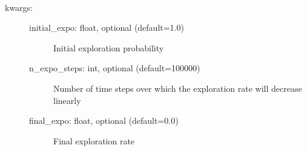 \documentclass[letterpaper,10pt,english]{sphinxmanual}
\begin{document}
\begin{fulllineitems}
\label{\detokenize{MultiAgentMarketRL:exploration_setting.LinearExplorationDecline}}~\begin{description}
\item[{kwargs:}] \leavevmode\begin{description}
\item[{initial\_expo: float, optional (default=1.0)}] \leavevmode
\sphinxAtStartPar
Initial exploration probability

\item[{n\_expo\_steps: int, optional (default=100000)}] \leavevmode
\sphinxAtStartPar
Number of time steps over which the exploration rate will decrease linearly

\item[{final\_expo: float, optional (default=0.0)}] \leavevmode
\sphinxAtStartPar
Final exploration rate

\end{description}

\end{description}

\begin{fulllineitems}
\label{\detokenize{MultiAgentMarketRL:exploration_setting.LinearExplorationDecline.__init__}}
\end{fulllineitems}


\begin{fulllineitems}
\label{\detokenize{MultiAgentMarketRL:exploration_setting.LinearExplorationDecline.reset}}
\end{fulllineitems}


\begin{fulllineitems}
\label{\detokenize{MultiAgentMarketRL:exploration_setting.LinearExplorationDecline.update}}
\end{fulllineitems}


\end{fulllineitems}
\end{document}
